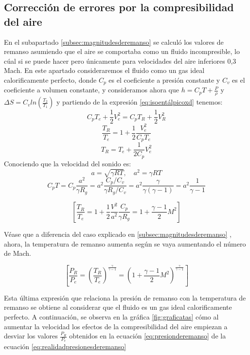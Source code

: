 \subsection{Corrección de errores por la compresibilidad del aire}
En el subapartado \ref{subsec:magnitudesderemanso} se calculó los valores de remanso asumiendo que el aire se comportaba como un fluido incompresible, lo cúal si se puede hacer pero únicamente para velocidades del aire inferiores 0,3 Mach. En este apartado consideraremos el fluido como un gas ideal calorificamente perfecto, donde \(C_p\) es el coeficiente a presión constante y \(C_v\) es el coeficiente a volumen constante, y consideramos ahora que \(h = C_p T + \frac{P}{\rho}\) y \(\Delta S = C_v ln(\frac{T_2}{T_1})\)  y partiendo de la expresión \ref{eq:isoentálpicoxd} tenemos:
\[
C_p T_e + \frac{1}{2} V_e^2 = C_p T_R + \frac{1}{2} V_R^2
\]
\[
\frac{T_R}{T_e} = 1 + \frac{1}{2} \frac{V_e^2}{C_p T_e}
\]
\[
\boxed{T_R = T_e + \frac{1}{2 C_p} V_e^2}
\]
Conociendo que la velocidad del sonido es: 
\[
a = \sqrt{\gamma R T}, \quad a^2 = \gamma R T
\]
\[
C_p T = C_p \frac{a^2}{\gamma R_g} = a^2 \frac{C_p / C_v}{\gamma R_g / C_v} = a^2 \frac{\gamma}{\gamma (\gamma - 1)} = a^2 \frac{1}{\gamma - 1}
\]
\begin{definicion}
	\begin{equation}
		\left[ \frac{T_R}{T_e} = 1 + \frac{1}{2} \frac{V^2}{a^2} \frac{C_p}{\gamma R_g} = 1 + \frac{\gamma - 1}{2} M^2 \right]
	\end{equation}
\end{definicion}


Véase que a diferencia del caso explicado en \ref{subsec:magnitudesderemanso} , ahora, la temperatura de remanso aumenta según se vaya aumentando el número de Mach.
\begin{definicion}
	\begin{equation}
		\left[ \frac{P_R}{P_e} = \left( \frac{T_R}{T_e} \right)^{\frac{\gamma}{\gamma -1}} = \left( 1 + \frac{\gamma -1}{2} M^2 \right)^{\frac{\gamma}{\gamma -1}} \right]
		\label{eq:realidadpresionesderemanso}
	\end{equation}
\end{definicion}

Esta última expresión que relaciona la presión de remanso con la temperatura de remanso se obtiene al considerar que el fluido es un gas ideal calorificamente perfecto. A continuación, se observa en la gráfica \ref{fig:graficatas} cómo al aumentar la velocidad los efectos de la compresibilidad del aire empiezan a desviar los valores \(\frac{P_R}{P_e}\) obtenidos en la ecuación \ref{eq:presionderemanso} de la ecuación \ref{eq:realidadpresionesderemanso}

